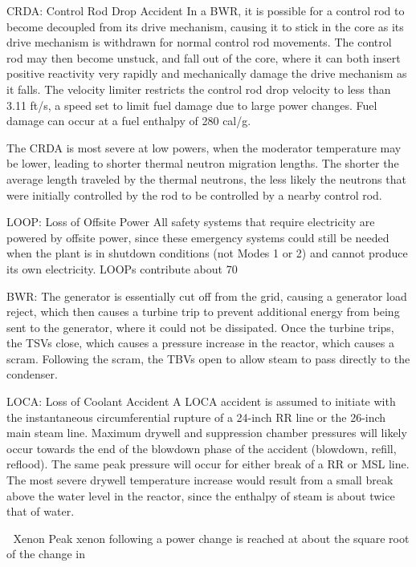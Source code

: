 \documentclass[10pt]{article}
\begin{document}
CRDA: Control Rod Drop Accident
In a BWR, it is possible for a control rod to become decoupled from its drive mechanism, causing it to stick in the core as its drive mechanism is withdrawn for normal control rod movements. The control rod may then become unstuck, and fall out of the core, where it can both insert positive reactivity very rapidly and mechanically damage the drive mechanism as it falls. The velocity limiter restricts the control rod drop velocity to less than 3.11 ft/s, a speed set to limit fuel damage due to large power changes. Fuel damage can occur at a fuel enthalpy of 280 cal/g. 

The CRDA is most severe at low powers, when the moderator temperature may be lower, leading to shorter thermal neutron migration lengths. The shorter the average length traveled by the thermal neutrons, the less likely the neutrons that were initially controlled by the rod to be controlled by a nearby control rod. 

LOOP: Loss of Offsite Power
All safety systems that require electricity are powered by offsite power, since these emergency systems could still be needed when the plant is in shutdown conditions (not Modes 1 or 2) and cannot produce its own electricity. LOOPs contribute about 70%

BWR: The generator is essentially cut off from the grid, causing a generator load reject, which then causes a turbine trip to prevent additional energy from being sent to the generator, where it could not be dissipated. Once the turbine trips, the TSVs close, which causes a pressure increase in the reactor, which causes a scram. Following the scram, the TBVs open to allow steam to pass directly to the condenser. 

LOCA: Loss of Coolant Accident
A LOCA accident is assumed to initiate with the instantaneous circumferential rupture of a 24-inch RR line or the 26-inch main steam line. Maximum drywell and suppression chamber pressures will likely occur towards the end of the blowdown phase of the accident (blowdown, refill, reflood). The same peak pressure will occur for either break of a RR or MSL line. The most severe drywell temperature increase would result from a small break above the water level in the reactor, since the enthalpy of steam is about twice that of water. 




Xenon
Peak xenon following a power change is reached at about the square root of the change in %
\end{document}
